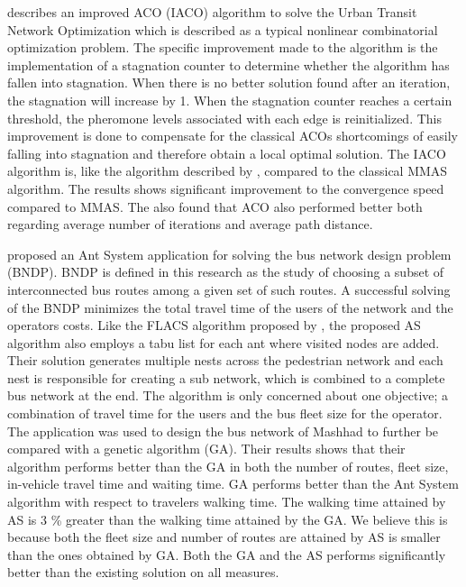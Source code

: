 \citet{jiang10} describes an improved ACO (IACO) algorithm to solve the Urban Transit Network Optimization which is described as a typical nonlinear combinatorial optimization problem. The specific improvement made to the algorithm is the implementation of a stagnation counter to determine whether the algorithm has fallen into stagnation. When there is no better solution found after an iteration, the stagnation will increase by 1. When the stagnation counter reaches a certain threshold, the pheromone levels associated with each edge is reinitialized. This improvement is done to compensate for the classical ACOs shortcomings of easily falling into stagnation and therefore obtain a local optimal solution. The IACO algorithm is, like the algorithm described by \citet{yang07}, compared to the classical MMAS algorithm. The results shows significant improvement to the convergence speed compared to MMAS. The also found that ACO also performed better both regarding average number of iterations and average path distance. 

\citet{poorzahedy11} proposed an Ant System application for solving the bus network design problem (BNDP). BNDP is defined in this research as the study of choosing a subset of interconnected bus routes among a given set of such routes. A successful solving of the BNDP minimizes the total travel time of the users of the network and the operators costs. Like the FLACS algorithm proposed by \citet{salehinejad10}, the proposed AS algorithm also employs a tabu list for each ant where visited nodes are added. Their solution generates multiple nests across the pedestrian network and each nest is responsible for creating a sub network, which is combined to a complete bus network at the end. The algorithm is only concerned about one objective; a combination of travel time for the users and the bus fleet size for the operator. The application was used to design the bus network of Mashhad to further be compared with a genetic algorithm (GA). Their results shows that their algorithm performs better than the GA in both the number of routes, fleet size, in-vehicle travel time and waiting time. GA performs better than the Ant System algorithm with respect to travelers walking time. The walking time attained by AS is 3 \% greater than the walking time attained by the GA. We believe this is because both the fleet size and number of routes are attained by AS is smaller than the ones obtained by GA. Both the GA and the AS performs significantly better than the existing solution on all measures.  

